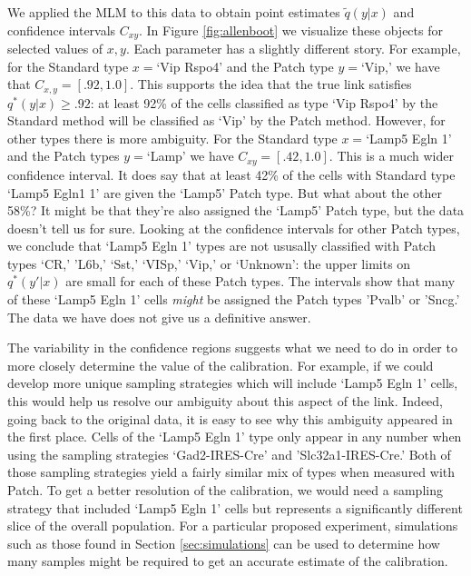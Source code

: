 \begin{itemize}
We applied the MLM to this data to obtain point estimates $\tilde q(y|x)$ and confidence intervals $C_{x y}$.  In Figure \ref{fig:allenboot} we visualize these objects for selected values of $x,y$.  Each parameter has a slightly different story.  For example, for the Standard type $x=$`Vip Rspo4' and the Patch type $y=$`Vip,' we have that $C_{x,y}=[.92,1.0]$.  This supports the idea that the true link satisfies $q^*(y|x)\geq .92$: at least 92\% of the cells classified as type `Vip Rspo4' by the Standard method will be classified as `Vip' by the Patch method.  However, for other types there is more ambiguity.  For the Standard type $x=$`Lamp5 Egln 1' and the Patch types $y=$`Lamp' we have $C_{x y}=[.42,1.0]$.  This is a much wider confidence interval.  It does say that at least 42\% of the cells with Standard type `Lamp5 Egln1 1' are given the `Lamp5' Patch type.  But what about the other 58\%?  It might be that they're also assigned the `Lamp5' Patch type, but the data doesn't tell us for sure.  Looking at the confidence intervals for other Patch types, we conclude that `Lamp5 Egln 1' types are not ususally classified with Patch types `CR,' 'L6b,' `Sst,' `VISp,' `Vip,' or `Unknown': the upper limits on $q^*(y'|x)$ are small for each of these Patch types.  The intervals show that many of these `Lamp5 Egln 1' cells \emph{might} be assigned the Patch types 'Pvalb' or 'Sncg.'  The data we have does not give us a definitive answer.

The variability in the confidence regions suggests what we need to do in order to more closely determine the value of the calibration.  For example, if we could develop more unique sampling strategies which will include `Lamp5 Egln 1' cells, this would help us resolve our ambiguity about this aspect of the link.  Indeed, going back to the original data, it is easy to see why this ambiguity appeared in the first place.  Cells of the `Lamp5 Egln 1' type only appear in any number when using the sampling strategies `Gad2-IRES-Cre' and 'Slc32a1-IRES-Cre.'  Both of those sampling strategies yield a fairly similar mix of types when measured with Patch.  To get a better resolution of the calibration, we would need a sampling strategy that included `Lamp5 Egln 1' cells but represents a significantly different slice of the overall population.  For a particular proposed experiment, simulations such as those found in Section \ref{sec:simulations} can be used to determine how many samples might be required to get an accurate estimate of the calibration.  




\end{itemize}

